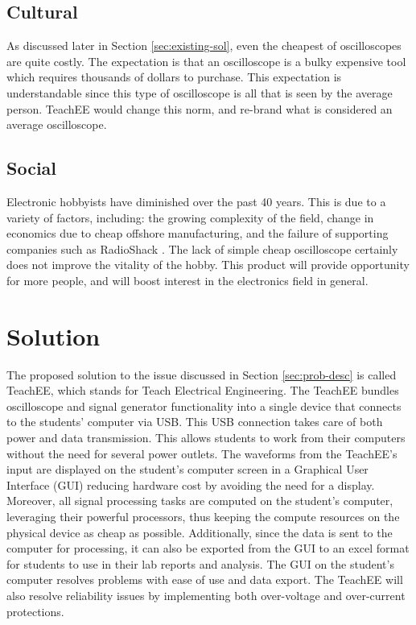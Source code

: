 \documentclass[letterpaper,12pt]{article}
\begin{document}
\subsection{Cultural}

As discussed later in Section \ref{sec:existing-sol}, even the cheapest of
oscilloscopes are quite costly. The expectation is that an oscilloscope is a
bulky expensive tool which requires thousands of dollars to purchase. This
expectation is understandable since this type of oscilloscope is all that is
seen by the average person. TeachEE would change this norm, and re-brand what is
considered an average oscilloscope.

\subsection{Social}

Electronic hobbyists have diminished over the past 40 years. This is due to a
variety of factors, including: the growing complexity of the field, change in
economics due to cheap offshore manufacturing, and the failure of supporting
companies such as RadioShack \cite{elec_hobby}. The lack of simple cheap
oscilloscope certainly does not improve the vitality of the hobby. This product
will provide opportunity for more people, and will boost interest in the
electronics field in general.

\section{Solution} %
The proposed solution to the issue discussed in Section \ref{sec:prob-desc} is
called TeachEE, which stands for Teach Electrical Engineering. The TeachEE
bundles oscilloscope and signal generator functionality into a single device
that connects to the students' computer via USB. This USB connection takes care
of both power and data transmission. This allows students to work from their
computers without the need for several power outlets. The waveforms from the
TeachEE's input are displayed on the student's computer screen in a Graphical
User Interface (GUI) reducing hardware cost by avoiding the need for a display.
Moreover, all signal processing tasks are computed on the student's computer,
leveraging their powerful processors, thus keeping the compute resources on the
physical device as cheap as possible. Additionally, since the data is
sent to the computer for processing, it can also be exported from the GUI to an
excel format for students to use in their lab reports and analysis. The GUI on
the student's computer resolves problems with ease of use and data export. The
TeachEE will also resolve reliability issues by implementing both over-voltage
and over-current protections.
\end{document}
